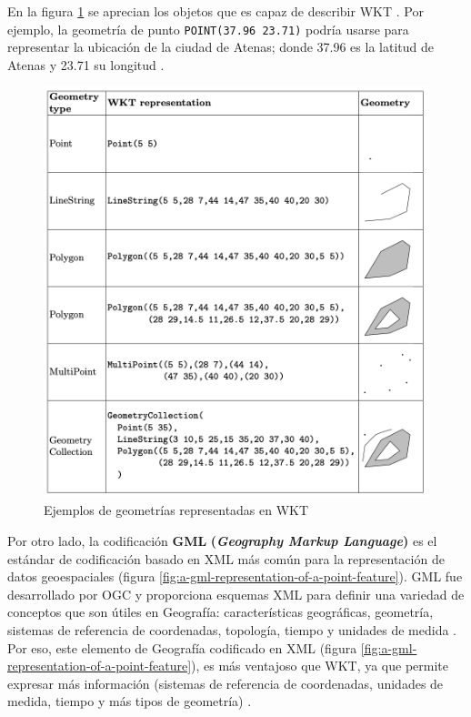 En la figura \ref{fig:wkt} se aprecian los objetos que es capaz de describir WKT \cite{wkt}. Por ejemplo, la geometría de punto \texttt{POINT(37.96 23.71)} podría usarse para representar la ubicación de la ciudad de Atenas; donde 37.96 es la latitud de Atenas y 23.71 su longitud \cite{wkt-database}.

\begin{figure}[H]
	\centering
	\includegraphics[width=0.93\linewidth]{imagenes/capitulo2/wkt}
	\caption{Ejemplos de geometrías representadas en WKT \cite{tesis-otro}}
	\label{fig:wkt}
\end{figure}

Por otro lado, la codificación \textbf{GML} \textbf{(\textit{Geography Markup Language})} es el estándar de codificación basado en XML más común para la representación de datos geoespaciales (figura \ref{fig:a-gml-representation-of-a-point-feature}). GML fue desarrollado por OGC y proporciona esquemas XML para definir una variedad de conceptos que son útiles en Geografía: características geográficas, geometría, sistemas de referencia de coordenadas, topología, tiempo y unidades de medida \cite{wkt-database}. Por eso, este elemento de Geografía codificado en XML (figura \ref{fig:a-gml-representation-of-a-point-feature}), es más ventajoso que WKT, ya que permite expresar más información (sistemas de referencia de coordenadas, unidades de medida, tiempo y más tipos de geometría) \cite{tesis-otro}. 


